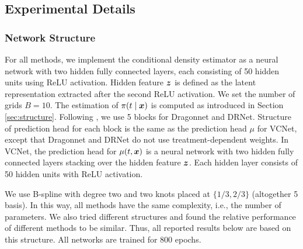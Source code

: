 \subsection{Experimental Details} \label{apxsec: exp}

\subsubsection{Network Structure} For all methods, we implement the conditional density estimator as a neural network with two hidden fully connected layers, each consisting of 50 hidden
units using ReLU activation. Hidden feature $\boldsymbol{z}$ is defined as the latent representation extracted after the second ReLU activation. We set the number of grids $B=10$. 
The estimation of $\pi(t\mid\boldsymbol{x})$ is computed as introduced in Section \ref{sec:structure}.
Following \cite{schwab2019learning}, we use 5 blocks for Dragonnet and DRNet. Structure of prediction head for each block is the same as the prediction head $\mu$ for VCNet, except that Dragonnet and DRNet do not use treatment-dependent weights. %
In VCNet, the prediction head for $\mu(t,\boldsymbol{x})$ is a neural network with two hidden
fully connected layers stacking over the hidden feature $\boldsymbol{z}$. Each hidden layer
consists of 50 hidden units with ReLU activation.

We use B-spline with degree two and two knots placed at $\{1/3,2/3\}$ (altogether 5 basis). In this way, all methods have the same complexity, i.e., the number of parameters. 
We also tried different structures and found the relative performance of different methods to be similar. Thus,
all reported results below are based on this structure. All networks are trained for 800 epochs.


